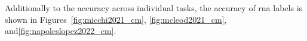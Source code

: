 
Additionally to the accuracy across individual tasks, the
accuracy of \gls{rna} labels is shown in
Figures~\ref{fig:micchi2021_cm}, \ref{fig:mcleod2021_cm},
and\ref{fig:napoleslopez2022_cm}.
